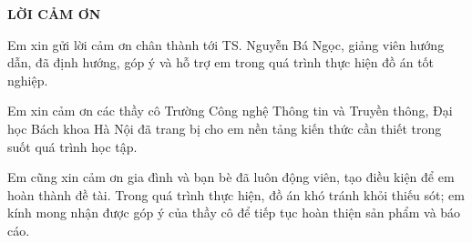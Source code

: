 \documentclass[../DoAn.tex]{subfiles}
\begin{document}
\begin{center}
    \Large{\textbf{LỜI CẢM ƠN}}\\
\end{center}
\vspace{1cm}

Em xin gửi lời cảm ơn chân thành tới TS. Nguyễn Bá Ngọc, giảng viên hướng dẫn, đã định hướng, góp ý và hỗ trợ em trong quá trình thực hiện đồ án tốt nghiệp.

Em xin cảm ơn các thầy cô Trường Công nghệ Thông tin và Truyền thông, Đại học Bách khoa Hà Nội đã trang bị cho em nền tảng kiến thức cần thiết trong suốt quá trình học tập.

Em cũng xin cảm ơn gia đình và bạn bè đã luôn động viên, tạo điều kiện để em hoàn thành đề tài. Trong quá trình thực hiện, đồ án khó tránh khỏi thiếu sót; em kính mong nhận được góp ý của thầy cô để tiếp tục hoàn thiện sản phẩm và báo cáo.
\end{document}
